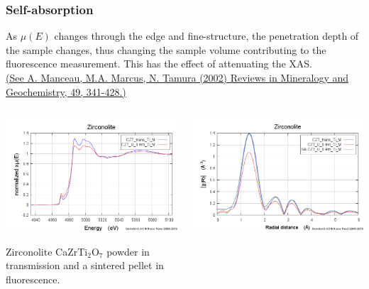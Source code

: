 \documentclass[10pt, xcolor=x11names, compress]{beamer}
\begin{document}
\begin{frame}
  \frametitle{Self-absorption}

  As $\mu(E)$ changes through the edge and fine-structure, the
  penetration depth of the sample changes, thus changing the sample
  volume contributing to the fluorescence measurement.  This has the
  effect of attenuating the XAS.\\[-0.5ex]
  \href{http://xafs.org/Experiment/OverAbsorption?action=AttachFile&do=get&target=overabsorption.pdf}{\color{Blue4}\tiny
    (See A. Manceau, M.A. Marcus, N. Tamura (2002) Reviews in
    Mineralogy and Geochemistry, 49, 341-428.)}

  \begin{columns}[T]
    \begin{column}{0.5\linewidth}
      \begin{center}
        \includegraphics[width=0.9\linewidth]{images/zirc_xanes.png}

        Zirconolite CaZrTi$_2$O$_7$ {\color{Blue3}powder in
          transmission} and a {\color{Red2}sintered pellet in
          fluorescence}.
      \end{center}
    \end{column}
    \begin{column}{0.5\linewidth}
      \begin{center}
        \includegraphics[width=0.9\linewidth]{images/zirc_chir.png}


\end{center}
\end{column}
\end{columns}
\end{frame}
\end{document}
